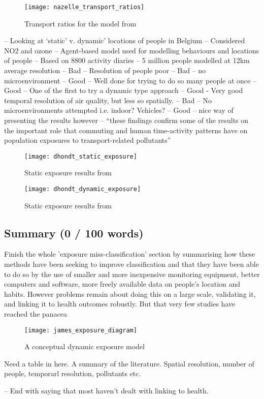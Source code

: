 \begin{figure}[H]
\centering
\texttt{[image: nazelle\_transport\_ratios]}
\caption{Transport ratios for the model from \cite{DeNazelle2013}}
\label{fig:nazelle_transport_ratios}
\end{figure}

\cite{Dhondt2012}
-- Looking at ‘static’ v. dynamic’ locations of people in Belgium
-- Considered NO2 and ozone
-- Agent-based model used for modelling behaviours and locations of people
-- Based on 8800 activity diaries
-- 5 million people modelled at 12km average resolution
-- Bad – Resolution of people poor
-- Bad – no microenvironment
-- Good – Well done for trying to do so many people at once
-- Good – One of the first to try a dynamic type approach
-- Good - Very good temporal resolution of air quality, but less so spatially.
-- Bad – No microenvironments attempted i.e. indoor? Vehicles?
-- Good – nice way of presenting the results however
-- “these findings confirm some of the results on the important role that commuting and human time-activity patterns have on population exposures to transport-related pollutants”

\begin{figure}[H]
\centering
\texttt{[image: dhondt\_static\_exposure]}
\caption{Static exposure results from \cite{Dhondt2012}}
\label{fig:dhondt_static_exposure}
\end{figure}

\begin{figure}[H]
\centering
\texttt{[image: dhondt\_dynamic\_exposure]}
\caption{Static exposure results from \cite{DeNazelle2013}}
\label{fig:dhondt_dynamic_exposure}
\end{figure}

\subsection{Summary (0 / 100 words)}
\label{subsec:dynamicexposuresummary}

Finish the whole 'exposure miss-classification' section by summarising how these methods have been seeking to improve classification and that they have been able to do so by the use of smaller and more inexpensive monitoring equipment, better computers and software, more freely available data on people's location and habits. However problems remain about doing this on a large scale, validating it, and linking it to health outcomes robustly. But that very few studies have reached the panacea

\begin{figure}[H]
\centering
\texttt{[image: james\_exposure\_diagram]}
\caption{A conceptual dynamic exposure model}
\label{fig:james_exposure_diagram}
\end{figure}

Need a table in here. A summary of the literature. Spatial resolution, number of people, temporarl resolution, pollutants etc.

-- End with saying that most haven’t dealt with linking to health.